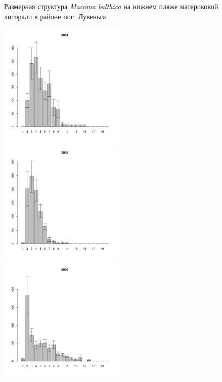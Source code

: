 \documentclass[12pt, a4paper]{article}
\begin{document}
\begin{figure}[h]
\begin{multicols}{3}
\end{multicols}


\caption{Размерная структура {\it Macoma balthica} на нижнем пляже материковой литорали в районе пос. Лувеньга}
\label{ris:size_str_2razrez_low}
\end{figure}



\begin{figure}[h]

\begin{multicols}{3}
\hfill
\includegraphics[width=60mm]{../White_Sea/Ryashkov_YuG/YuG_2001_.pdf}
\hfill
\includegraphics[width=60mm]{../White_Sea/Ryashkov_YuG/YuG_2005_.pdf}
\hfill
\includegraphics[width=60mm]{../White_Sea/Ryashkov_YuG/YuG_2009_.pdf}
\end{multicols}


\end{figure}
\end{document}
